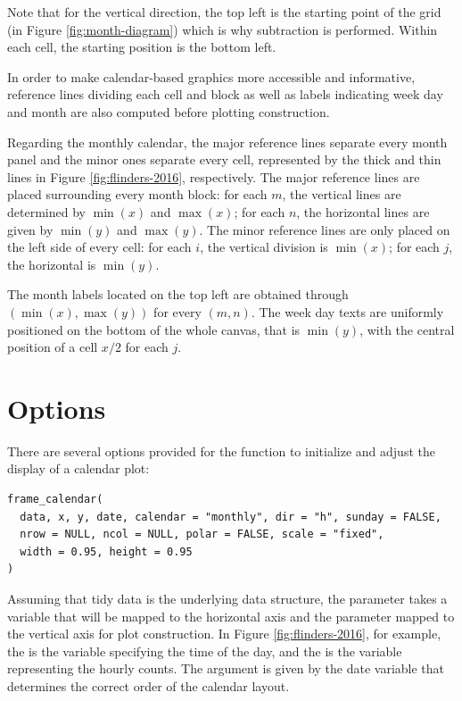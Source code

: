 \documentclass[article]{jss}
\theoremstyle{definition}
\theoremstyle{definition}
\theoremstyle{remark}
\begin{document}
Note that for the vertical direction, the top left is the starting point
of the grid (in Figure \ref{fig:month-diagram}) which is why subtraction
is performed. Within each cell, the starting position is the bottom
left.

In order to make calendar-based graphics more accessible and
informative, reference lines dividing each cell and block as well as
labels indicating week day and month are also computed before plotting
construction.

Regarding the monthly calendar, the major reference lines separate every
month panel and the minor ones separate every cell, represented by the
thick and thin lines in Figure \ref{fig:flinders-2016}, respectively.
The major reference lines are placed surrounding every month block: for
each \(m\), the vertical lines are determined by \(\min{(x)}\) and
\(\max{(x)}\); for each \(n\), the horizontal lines are given by
\(\min{(y)}\) and \(\max{(y)}\). The minor reference lines are only
placed on the left side of every cell: for each \(i\), the vertical
division is \(\min{(x)}\); for each \(j\), the horizontal is
\(\min{(y)}\).

The month labels located on the top left are obtained through
\((\min{(x)}, \max{(y)})\) for every \((m, n)\). The week day texts are
uniformly positioned on the bottom of the whole canvas, that is
\(\min{(y)}\), with the central position of a cell \(x / 2\) for each
\(j\).

\section{Options}\label{options}

\label{sec:opt}

There are several options provided for the 
function to initialize and adjust the display of a calendar plot:

\begin{verbatim}
frame_calendar(
  data, x, y, date, calendar = "monthly", dir = "h", sunday = FALSE, 
  nrow = NULL, ncol = NULL, polar = FALSE, scale = "fixed",
  width = 0.95, height = 0.95
)
\end{verbatim}

Assuming that tidy data \citep{wickham2014tidy} is the underlying data
structure, the parameter  takes a variable that will be mapped
to the horizontal axis and the parameter  mapped to the vertical
axis for plot construction. In Figure \ref{fig:flinders-2016}, for
example, the  is the variable specifying the time of the day,
and the  is the variable representing the hourly counts. The
 argument is given by the date variable that determines the
correct order of the calendar layout.
\end{document}
